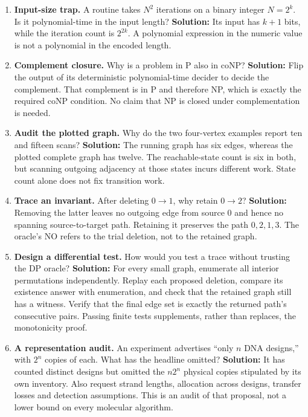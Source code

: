 \begin{enumerate}
\item
  \textbf{Input-size trap.} A routine takes \(N^2\) iterations on a
  binary integer \(N=2^k\). Is it polynomial-time in the input length?
  \textbf{Solution:} Its input has \(k+1\) bits, while the iteration
  count is \(2^{2k}\). A polynomial expression in the numeric value is
  not a polynomial in the encoded length.
\item
  \textbf{Complement closure.} Why is a problem in P also in coNP?
  \textbf{Solution:} Flip the output of its deterministic
  polynomial-time decider to decide the complement. That complement is
  in P and therefore NP, which is exactly the required coNP condition.
  No claim that NP is closed under complementation is needed.
\item
  \textbf{Audit the plotted graph.} Why do the two four-vertex examples
  report ten and fifteen scans? \textbf{Solution:} The running graph has
  six edges, whereas the plotted complete graph has twelve. The
  reachable-state count is six in both, but scanning outgoing adjacency
  at those states incurs different work. State count alone does not fix
  transition work.
\item
  \textbf{Trace an invariant.} After deleting \(0\to1\), why retain
  \(0\to2\)? \textbf{Solution:} Removing the latter leaves no outgoing
  edge from source 0 and hence no spanning source-to-target path.
  Retaining it preserves the path \(0,2,1,3\). The oracle's NO refers to
  the trial deletion, not to the retained graph.
\item
  \textbf{Design a differential test.} How would you test a trace
  without trusting the DP oracle? \textbf{Solution:} For every small
  graph, enumerate all interior permutations independently. Replay each
  proposed deletion, compare its existence answer with enumeration, and
  check that the retained graph still has a witness. Verify that the
  final edge set is exactly the returned path's consecutive pairs.
  Passing finite tests supplements, rather than replaces, the
  monotonicity proof.
\item
  \textbf{A representation audit.} An experiment advertises ``only \(n\)
  DNA designs,'' with \(2^n\) copies of each. What has the headline
  omitted? \textbf{Solution:} It has counted distinct designs but
  omitted the \(n2^n\) physical copies stipulated by its own inventory.
  Also request strand lengths, allocation across designs, transfer
  losses and detection assumptions. This is an audit of that proposal,
  not a lower bound on every molecular algorithm.
\end{enumerate}

